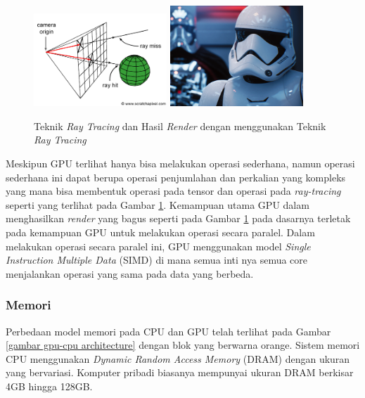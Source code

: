 \begin{figure}[H]
  \centering
  \includegraphics[width=5cm]{images/rt-setup2.png}
  \includegraphics[width=5cm]{images/Reflections_02.png}
  \caption{Teknik \emph{Ray Tracing} dan Hasil \emph{Render} dengan menggunakan
    Teknik \emph{Ray Tracing}}
  \label{gambar ray tracing technique}
\end{figure}

Meskipun GPU terlihat hanya bisa melakukan operasi sederhana, namun operasi
sederhana ini dapat berupa operasi penjumlahan dan perkalian yang kompleks yang
mana bisa membentuk operasi pada tensor dan operasi pada \emph{ray-tracing}
seperti yang terlihat pada Gambar \ref{gambar ray tracing technique}. Kemampuan
utama GPU dalam menghasilkan \emph{render} yang bagus seperti pada Gambar
\ref{gambar ray tracing technique} pada dasarnya terletak pada kemampuan GPU
untuk melakukan operasi secara paralel. Dalam melakukan operasi secara paralel
ini, GPU menggunakan model \emph{Single Instruction Multiple Data} (SIMD) di
mana semua inti nya semua core menjalankan operasi yang sama pada data yang
berbeda.

\subsubsection{Memori}

Perbedaan model memori pada CPU dan GPU telah terlihat pada Gambar \ref{gambar
  gpu-cpu architecture} dengan blok yang berwarna orange. Sistem memori CPU
menggunakan \emph{Dynamic Random Access Memory} (DRAM) dengan ukuran yang
bervariasi. Komputer pribadi biasanya mempunyai ukuran DRAM berkisar 4GB hingga
128GB.


